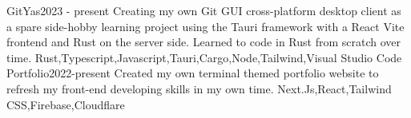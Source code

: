%
%
%


\begin{projects}
	\project
	{GitYas}{2023 - present}
    {}
	{Creating my own Git GUI cross-platform desktop client as a spare side-hobby learning project using the Tauri framework with a React Vite frontend and Rust on the server side. Learned to code in Rust from scratch over time.}
	{Rust,Typescript,Javascript,Tauri,Cargo,Node,Tailwind,Visual Studio Code}
    \project
	{Portfolio}{2022-present}
	{}
	{Created my own terminal themed portfolio website to refresh my front-end developing skills in my own time.}
	{Next.Js,React,Tailwind CSS,Firebase,Cloudflare}
\end{projects}